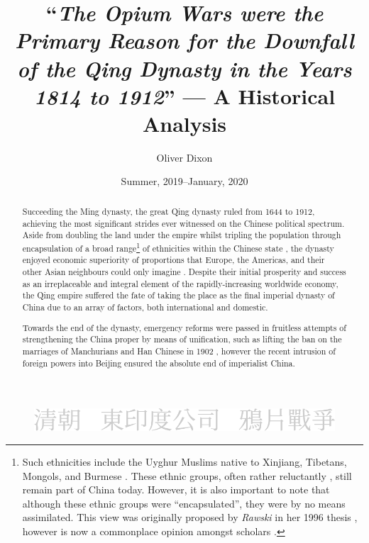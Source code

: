 \documentclass[a4paper,oneside]{article}
\title{``\emph{The Opium Wars were the Primary Reason for the Downfall of the
        Qing Dynasty in the Years 1814 to 1912}'' --- A Historical Analysis}
\author{Oliver Dixon}
\date{Summer, 2019--January, 2020}
\begin{document}
\clearpage\maketitle
\thispagestyle{titlehdr}
\pagestyle{stdhdr}

\vspace*{-1.5em}
\begin{figure}[h!]
	\centering
        \includegraphics[width=0.5\linewidth]{chinese_frontcover.pdf}
\end{figure}
\vspace*{-0.5em}

\begin{abstract}
        Succeeding the Ming dynasty, the great Qing dynasty ruled from 1644 to
        1912, achieving the most significant strides ever witnessed on the
        Chinese political spectrum. Aside from doubling the land under the
        empire \autocites{Turchin:2006}{Goldstone:1995} whilst tripling the
        population through encapsulation of a broad range\footnote{Such
        ethnicities include the Uyghur Muslims native to Xinjiang, Tibetans,
        Mongols, and Burmese \autocite{Chia:1993}. These ethnic groups, often
        rather reluctantly \autocites{Teichman:2002}{Smith:2009}{Dwyer:2005},
        still remain part of China today. However, it is also important to note
        that although these ethnic groups were ``encapsulated'', they were by no
        means assimilated.  This view was originally proposed by \textit{Rawski}
        in her 1996 thesis \autocite{Rawski:1996}, however is now a commonplace
        opinion amongst scholars \autocite{Hou:2014}.} of ethnicities within the
        Chinese state \autocite{Rowe:2012}, the dynasty enjoyed economic
        superiority of proportions that Europe, the Americas, and their other
        Asian neighbours could only imagine \autocite{Maddison:2007}. Despite
        their initial prosperity and success as an irreplaceable and integral
        element of the rapidly-increasing worldwide economy, the Qing empire
        suffered the fate of taking the place as the final imperial dynasty of
        China due to an array of factors, both international and domestic.

        Towards the end of the dynasty, emergency reforms were passed in
        fruitless attempts of strengthening the China proper by means of
        unification, such as lifting the ban on the marriages of Manchurians and
        Han Chinese in 1902 \autocite{Rhoads:2000}, however the recent intrusion
        of foreign powers into Beijing ensured the absolute end of imperialist
        China.


\end{abstract}
\end{document}
